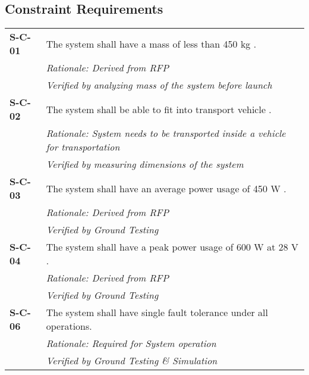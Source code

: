 \subsection{Constraint Requirements}
\vspace{-15pt}
\begin{longtable}{P{1.5cm}P{14.25cm}}
\textbf{S-C-01}	& The system shall have a mass of less than 450 \gls{kg} \cite{RFP}. \\
& \textit{Rationale: Derived from \gls{RFP} }	\\
& \textit{Verified by analyzing mass of the system before launch}	\\
\textbf{S-C-02}	& The system shall be able to fit into transport vehicle \cite{RFP}. \\
& \textit{Rationale: System needs to be transported inside a vehicle for transportation}	\\
& \textit{Verified by measuring dimensions of the system}\\
\textbf{S-C-03}	& The system shall have an average power usage of 450 \gls{W} \cite{RFP}.\\
& \textit{Rationale: Derived from \gls{RFP}}	\\
& \textit{Verified by Ground Testing}						\\
\textbf{S-C-04}	& The system shall have a peak power usage of 600 \gls{W} at 28 \gls{V} \cite{RFP}. \\
& \textit{Rationale: Derived from \gls{RFP}}	\\
& \textit{Verified by Ground Testing}						\\
\textbf{S-C-06}	& The system shall have single fault tolerance under all operations.\\
& \textit{Rationale: Required for System operation}	\\
& \textit{Verified by Ground Testing \& Simulation}	\\
\end{longtable}
